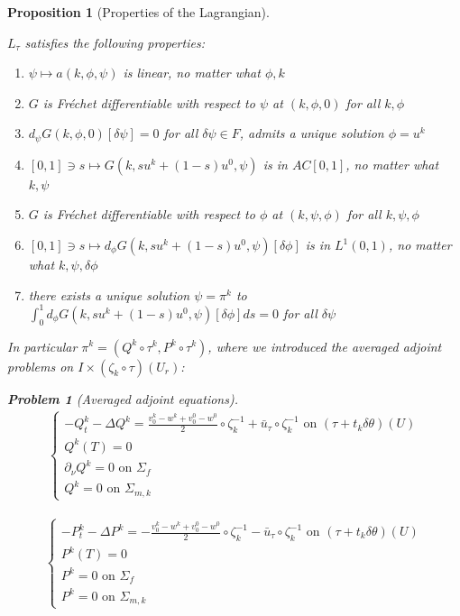 \documentclass[english,a4paper,10pt,oneside]{scrbook}	%
\theoremstyle{break}
\newtheorem{prop}[equation]{Proposition}
\newtheorem{pb}[equation]{Problem}
\theoremstyle{remark}
\newcommand{\ds}{\displaystyle}
\newcommand{\te}{\theta}
\begin{document}
\begin{prop}[Properties of the Lagrangian]
\label{prop:lagr}

$L_\tau$ satisfies the following properties:

\begin{enumerate}
	\item $\psi \mapsto a(k, \phi,\psi)$ is linear, no matter what $\phi,k$
	\item $G$ is Fréchet differentiable with respect to $\psi$ at $(k,\phi,0)$ for all $k, \phi$
	\item $d_\psi G(k,\phi,0)[\delta \psi]=0$ for all $\delta \psi \in F$, admits a unique solution $\phi = u^k$
	\item $[0,1]\ni s \mapsto G(k, su^k + (1-s)u^0,\psi)$ is in $AC[0,1]$, no matter what $k, \psi$
	\item $G$ is Fréchet differentiable with respect to $\phi$ at $(k,\psi,\phi)$ for all $k, \psi, \phi$
	\item $[0,1]\ni s \mapsto d_\phi G(k, su^k + (1-s)u^0,\psi)[\delta \phi]$ is in $L^1(0,1)$, no matter what $k, \psi, \delta \phi$
	\item there exists a unique solution $\psi = \pi^k$ to $\ds \int_0^1 d_\phi G(k, su^k + (1-s)u^0,\psi)[\delta \phi]ds =0$ for all $\delta \psi$ 
\end{enumerate}

In particular $\pi^k = (Q^k \circ \tau^k,P^k \circ \tau^k)$, where we introduced the averaged adjoint problems on $I\times (\zeta_k\circ \tau )(U_r)$:

\begin{pb}[Averaged adjoint equations]
\label{pb:avg_adj_pb}
\begin{align*}
\left\{\begin{matrix}
-Q^k_t-\Delta Q^k =\frac{v_0^k-w^k+v_0^0-w^0}{2}\circ \zeta_k^{-1}+\bar{u}_\tau\circ \zeta_k^{-1}  \text{ on } (\tau + t_k\delta \te)(U) \\
Q^k(T)=0\\
\partial_\nu Q^k = 0 \text{ on } \Sigma_f\\
Q^k = 0 \text{ on } \Sigma_{m,k}
\end{matrix}\right.
\end{align*}

\begin{align*}
\left\{\begin{matrix}
-P^k_t-\Delta P^k =-\frac{v_0^k-w^k+v_0^0-w^0}{2}\circ \zeta_k^{-1}-\bar{u}_\tau\circ \zeta_k^{-1} \text{ on } (\tau + t_k\delta \te)(U)\\
P^k(T)=0\\
P^k = 0 \text{ on } \Sigma_f\\
P^k = 0 \text{ on } \Sigma_{m,k}
\end{matrix}\right.
\end{align*}
\end{pb}

\end{prop}
\end{document}
